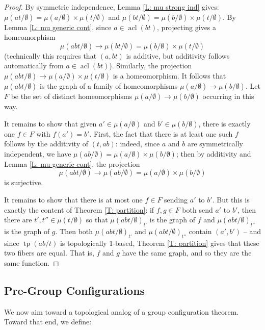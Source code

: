 \documentclass{amsart}
\theoremstyle{definition}
\newcommand{\acl}{\operatorname{acl}}
\newcommand{\tp}{\operatorname{tp}}
\begin{document}
\begin{proof}
    By symmetric independence, Lemma \ref{L: mu strong ind} gives: $\mu(at/\emptyset)=\mu(a/\emptyset)\times\mu(t/\emptyset)$ and $\mu(bt/\emptyset)=\mu(b/\emptyset)\times\mu(t/\emptyset)$. By Lemma \ref{L: mu generic cont}, since $a\in\acl(bt)$, projecting gives a homeomorphism $$\mu(abt/\emptyset)\rightarrow\mu(bt/\emptyset)=\mu(b/\emptyset)\times\mu(t/\emptyset)$$ (technically this requires that $(a,bt)$ is additive, but additivity follows automatically from $a\in\acl(bt)$). Similarly, the projection $\mu(abt/\emptyset)\rightarrow\mu(a/\emptyset)\times\mu(t/\emptyset)$ is a homeomorphism. It follows that $\mu(abt/\emptyset)$ is the graph of a family of homeomorphisms $\mu(a/\emptyset)\rightarrow\mu(b/\emptyset)$. Let $F$ be the set of distinct homeomorphisms $\mu(a/\emptyset)\rightarrow\mu(b/\emptyset)$ occurring in this way.

    It remains to show that given $a'\in\mu(a/\emptyset)$ and $b'\in\mu(b/\emptyset)$, there is exactly one $f\in F$ with $f(a')=b'$. First, the fact that there is at least one such $f$ follows by the additivity of $(t,ab)$: indeed, since $a$ and $b$ are symmetrically independent, we have $\mu(ab/\emptyset)=\mu(a/\emptyset)\times\mu(b/\emptyset)$; then by additivity and Lemma \ref{L: mu generic cont}, the projection $$\mu(abt/\emptyset)\rightarrow\mu(ab/\emptyset)=\mu(a/\emptyset)\times\mu(b/\emptyset)$$ is surjective.
    
    It remains to show that there is at most one $f\in F$ sending $a'$ to $b'$. But this is exactly the content of Theorem \ref{T: partition}: if $f,g\in F$ both send $a'$ to $b'$, then there are $t',t''\in\mu(t/\emptyset)$ so that $\mu(abt/\emptyset)_{t'}$ is the graph of $f$ and $\mu(abt/\emptyset)_{t''}$ is the graph of $g$. Then both $\mu(abt/\emptyset)_{t'}$ and $\mu(abt/\emptyset)_{t''}$ contain $(a',b')$ -- and since $\tp(ab/t)$ is topologically 1-based, Theorem \ref{T: partition} gives that these two fibers are equal. That is, $f$ and $g$ have the same graph, and so they are the same function.
    \end{proof}

    \subsection{Pre-Group Configurations}

    We now aim toward a topological analog of a group configuration theorem. Toward that end, we define:
    
\end{document}
